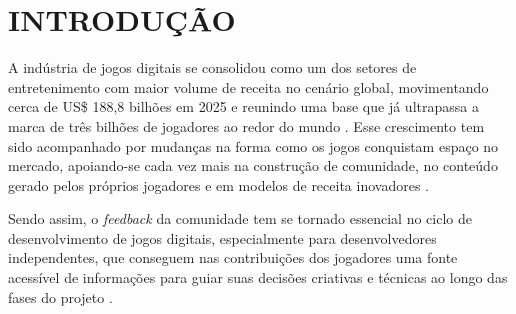 \chapter{INTRODUÇÃO} \label{cha:introducao}




A indústria de jogos digitais se consolidou como um dos setores de entretenimento com maior volume de receita no cenário global, movimentando cerca de US\$ 188,8 bilhões em 2025 e reunindo uma base que já ultrapassa a marca de três bilhões de jogadores ao redor do mundo \cite{newzoo2025}. Esse crescimento tem sido acompanhado por mudanças na forma como os jogos conquistam espaço no mercado, apoiando-se cada vez mais na construção de comunidade, no conteúdo gerado pelos próprios jogadores e em modelos de receita inovadores \cite{bain2025}.

Sendo assim, o \textit{feedback} da comunidade tem se tornado essencial no ciclo de desenvolvimento de jogos digitais, especialmente para desenvolvedores independentes, que conseguem nas contribuições dos jogadores uma fonte acessível de informações para guiar suas decisões criativas e técnicas ao longo das fases do projeto \cite{uchoa2018}.

